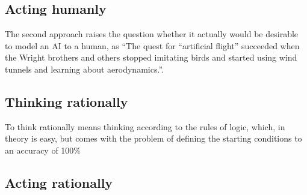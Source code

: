 \subsection{Acting humanly}
The second approach raises the question whether it actually would be desirable
to model an AI to a human, as “The quest for “artificial flight” succeeded when the Wright brothers and others stopped imitating birds and started using wind tunnels and learning about aerodynamics.”\cite[page 3]{russellArtificialIntelligenceModern2010}. 
\subsection{Thinking rationally}
To think rationally means thinking according to the rules of logic, which, in theory is easy, but comes with the problem of defining the starting conditions to an accuracy of 100\% 
\subsection{Acting rationally}